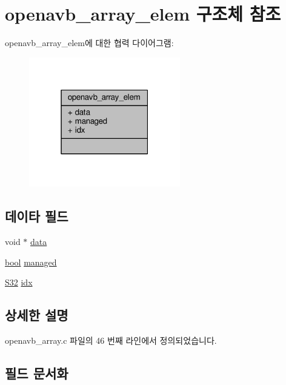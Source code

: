 \hypertarget{structopenavb__array__elem}{}\section{openavb\+\_\+array\+\_\+elem 구조체 참조}
\label{structopenavb__array__elem}


openavb\+\_\+array\+\_\+elem에 대한 협력 다이어그램\+:
\nopagebreak
\begin{figure}[H]
\begin{center}
\leavevmode
\includegraphics[width=187pt]{structopenavb__array__elem__coll__graph}
\end{center}
\end{figure}
\subsection*{데이타 필드}
\begin{DoxyCompactItemize}
\item 
void $\ast$ \hyperlink{structopenavb__array__elem_a735984d41155bc1032e09bece8f8d66d}{data}
\item 
\hyperlink{avb__gptp_8h_af6a258d8f3ee5206d682d799316314b1}{bool} \hyperlink{structopenavb__array__elem_a8ff69266b2f44d218fdfe0c9d6950409}{managed}
\item 
\hyperlink{openavb__types__base__pub_8h_a39c786017723555afb9e8b85accec0de}{S32} \hyperlink{structopenavb__array__elem_acaea95a991ace601bbb6335cc78efd4a}{idx}
\end{DoxyCompactItemize}


\subsection{상세한 설명}


openavb\+\_\+array.\+c 파일의 46 번째 라인에서 정의되었습니다.



\subsection{필드 문서화}
